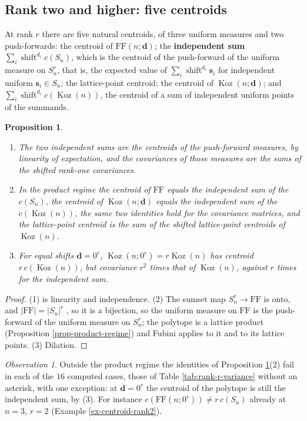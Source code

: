 \documentclass[11pt, a4paper, abstract=yes]{scrartcl}
\theoremstyle{definition}
\theoremstyle{remark}
\theoremstyle{plain}
\newtheorem{proposition}[definition]{Proposition}
\newcommand{\vek}[1]{\boldsymbol{#1}}
\theoremstyle{remark}
\newtheorem{observation}[definition]{Observation}
\theoremstyle{plain}
\newcommand{\Koz}{\operatorname{Koz}}
\newcommand{\shift}{\operatorname{shift}}
\newcommand{\FF}{\mathrm{FF}}
\newcommand{\leandiscof}[1]{\tikz[baseline=-0.6ex]\fill[#1] (0,0) circle (0.6ex);}
\newcommand{\leanfull}{\leandiscof{leanfull}}
\newcommand{\leanmark}[1]{\leavevmode{\reversemarginpar\marginnote{\raggedleft#1}}}
\begin{document}
\subsection{Rank two and higher: five centroids}
\label{sec:orga9db033}

At rank \(r\) there are five natural centroids, of three uniform measures and two push-forwards:
the centroid of \(\FF(n;\vek d)\); the
\textbf{independent sum} \(\sum_i\shift^{d_i}c(S_n)\), which is the centroid of the push-forward of the
uniform measure on \(S_n^r\), that is, the expected value of \(\sum_i\shift^{d_i}\vek s_i\) for
independent uniform \(\vek s_i\in S_n\); the lattice-point
centroid; the centroid of \(\Koz(n;\vek d)\); and \(\sum_i\shift^{d_i}c(\Koz(n))\), the centroid of a
sum of independent uniform points of the summands.

\begin{proposition}
\begin{enumerate}
\item \leanmark{\leanfull}The two independent sums are the centroids of the push-forward measures, by linearity of
expectation, and the covariances of those measures are the sums of the shifted rank-one
covariances.
\item In the product regime the centroid of \(\FF\) equals the independent sum of the \(c(S_n)\), the
centroid of \(\Koz(n;\vek d)\) equals the independent sum of the \(c(\Koz(n))\), the same two
identities hold for the covariance matrices, and the lattice-point centroid is the sum of the shifted lattice-point centroids
of \(\Koz(n)\).
\item For equal shifts \(\vek d=0^r\), \(\Koz(n;0^r)=r\Koz(n)\) has centroid \(r\,c(\Koz(n))\), but
covariance \(r^2\) times that of \(\Koz(n)\), against \(r\) times for the independent sum.
\end{enumerate}
\label{prop-pushforward}
\end{proposition}

\begin{proof}
(1) is linearity and independence. (2) The sumset map \(S_n^r\to\FF\) is onto, and
\(\lvert\FF\rvert=\lvert S_n\rvert^r\) \autocite[Proposition 42]{SnellmanArticle2}, so it is a bijection, so the uniform measure on \(\FF\) is the push-forward of the
uniform measure on \(S_n^r\); the polytope is a lattice product (Proposition \ref{prop-product-regime})
and Fubini applies to it and to its lattice points. (3) Dilation.
\end{proof}

\begin{observation}
Outside the product regime the identities of Proposition \ref{prop-pushforward}(2) fail in each of the
\(16\) computed cases, those of Table \ref{tab:rank-r-variance} without an asterisk, with one exception:
at \(\vek d=0^r\) the centroid of the polytope is still the independent sum, by (3). For instance
\(c(\FF(n;0^r))\ne r\,c(S_n)\) already at \(n=3\), \(r=2\) (Example \ref{ex-centroid-rank2}).
\label{obs-pushforward-fails}
\end{observation}
\end{document}
